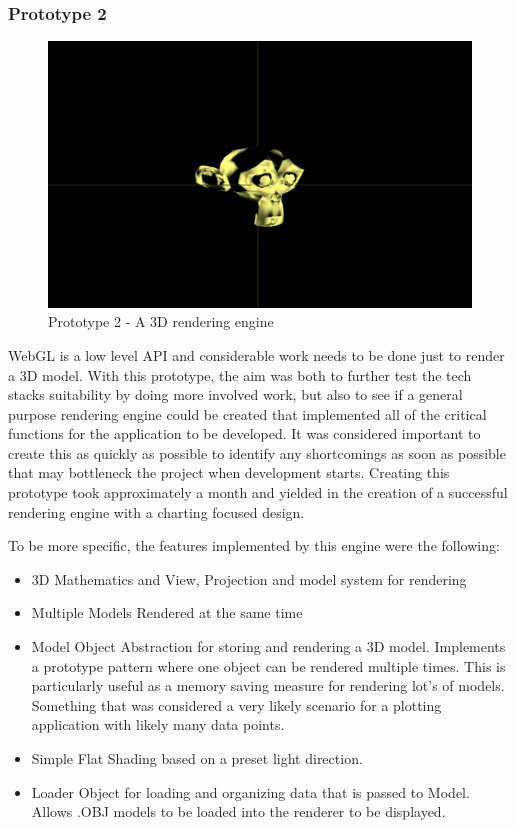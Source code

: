 \subsubsection {Prototype 2}
\begin{figure}[h]
    \centering
    \includegraphics[width=1\columnwidth]{author-files/figures/Monkey-Test2.png}
    \caption{Prototype 2 - A 3D rendering engine}
    \label{fig:Monkey}
\end{figure}

WebGL is a low level API and considerable work needs to be done just to render a 3D model. With this prototype, the aim was both to further test the tech stacks suitability by doing more involved work, but also to see if a general purpose rendering engine could be created that implemented all of the critical functions for the application to be developed. It was considered important to create this as quickly as possible to identify any shortcomings as soon as possible that may bottleneck the project when development starts. Creating this prototype took approximately a month and yielded in the creation of a successful rendering engine with a charting focused design.

To be more specific, the features implemented by this engine were the following:
\begin{itemize}
    \item 3D Mathematics and View, Projection and model system for rendering
    \item Multiple Models Rendered at the same time
    \item Model Object Abstraction for storing and rendering a 3D model. Implements a prototype pattern where one object can be rendered multiple times. This is particularly useful as a memory saving measure for rendering lot's of models. Something that was considered a very likely scenario for a plotting application with likely many data points.
    \item Simple Flat Shading based on a preset light direction.
    \item Loader Object for loading and organizing data that is passed to Model. Allows .OBJ models to be loaded into the renderer to be displayed.
\end{itemize}

